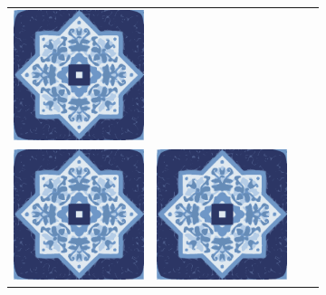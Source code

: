 \documentclass{oci}
\begin{document}
\begin{problemDescription}
\begin{figure}[h]
\begin{subfigure}{0.45\textwidth}
\begin{center}
{\begin{tabular}{cccc}
        \includegraphics[scale=0.3]{a.eps} \\
        \includegraphics[scale=0.3]{a.eps} &
        \includegraphics[scale=0.3]{a.eps} &

\end{tabular}}
\end{center}
\end{subfigure}
\end{figure}
\end{problemDescription}
\end{document}
